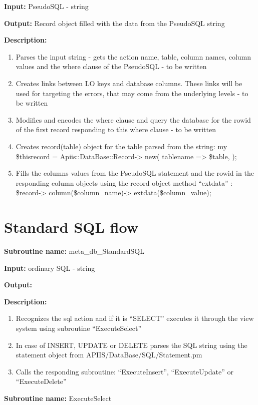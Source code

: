 \textbf{Input:} PseudoSQL - string

\textbf{Output:} Record object filled with the data from the PseudoSQL
string

\textbf{Description: }

\begin{enumerate}
\item Parses the input string - gets the action name, table, column names,
column values and the where clause of the PseudoSQL - to be written 
\item Creates links between LO keys and database columns. These links will be used for targeting the errors, that may come from the underlying levels - to be written
\item Modifies and encodes the where clause and query the database for the
rowid of the first record responding to this where clause - to be
written
\item Creates record(table) object for the table parsed from the string:
my \$thisrecord = Apiis::DataBase::Record-> new( tablename =>  \$table,
); 
\item Fills the columns values from the PseudoSQL statement and the rowid
in the responding column objects using the record object method {}``extdata''
: \$record-> column(\$column\_name)-> extdata(\$column\_value); 
\end{enumerate}

\section{Standard SQL flow}

\textbf{Subroutine name:} meta\_db\_StandardSQL

\textbf{Input:} ordinary SQL - string

\textbf{Output:} 

\textbf{Description:}

\begin{enumerate}
\item Recognizes the sql action and if it is {}``SELECT'' executes it
through the view system using subroutine {}``ExecuteSelect'' 
\item In case of INSERT, UPDATE or DELETE parses the SQL string using the statement object from APIIS/DataBase/SQL/Statement.pm 
\item Calls the responding subroutine: {}``ExecuteInsert'', {}``ExecuteUpdate'' or {}``ExecuteDelete''

\end{enumerate}
\textbf{Subroutine name:} ExecuteSelect

